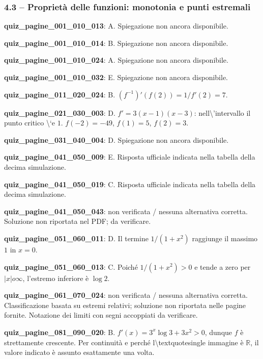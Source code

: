 \documentclass[11pt,a4paper]{article}
\newcounter{quiz}
\begin{document}
\subsubsection*{4.3 -- Proprietà delle funzioni: monotonia e punti estremali}
\noindent\textbf{quiz\_pagine\_001\_010\_013}: A. Spiegazione non ancora disponibile.\par\medskip
\noindent\textbf{quiz\_pagine\_001\_010\_014}: B. Spiegazione non ancora disponibile.\par\medskip
\noindent\textbf{quiz\_pagine\_001\_010\_024}: A. Spiegazione non ancora disponibile.\par\medskip
\noindent\textbf{quiz\_pagine\_001\_010\_032}: E. Spiegazione non ancora disponibile.\par\medskip
\noindent\textbf{quiz\_pagine\_011\_020\_024}: B. $(f^{-1})\prime(f(2))=1/f\prime(2)=7$.\par\medskip
\noindent\textbf{quiz\_pagine\_021\_030\_003}: D. $f\prime=3(x-1)(x-3)$: nell\textbackslash{}'intervallo il punto critico \textbackslash{}`e $1$. $f(-2)=-49$, $f(1)=5$, $f(2)=3$.\par\medskip
\noindent\textbf{quiz\_pagine\_031\_040\_004}: D. Spiegazione non ancora disponibile.\par\medskip
\noindent\textbf{quiz\_pagine\_041\_050\_009}: E. Risposta ufficiale indicata nella tabella della decima simulazione.\par\medskip
\noindent\textbf{quiz\_pagine\_041\_050\_019}: C. Risposta ufficiale indicata nella tabella della decima simulazione.\par\medskip
\noindent\textbf{quiz\_pagine\_041\_050\_043}: non verificata / nessuna alternativa corretta. Soluzione non riportata nel PDF; da verificare.\par\medskip
\noindent\textbf{quiz\_pagine\_051\_060\_011}: D. Il termine $1/(1+x^2)$ raggiunge il massimo $1$ in $x=0$.\par\medskip
\noindent\textbf{quiz\_pagine\_051\_060\_013}: C. Poiché $1/(1+x^2)>0$ e tende a zero per $|x|	o\infty$, l'estremo inferiore è $\log2$.\par\medskip
\noindent\textbf{quiz\_pagine\_061\_070\_024}: non verificata / nessuna alternativa corretta. Classificazione basata su estremi relativi; soluzione non riportata nelle pagine fornite. Notazione dei limiti con segni accoppiati da verificare.\par\medskip
\noindent\textbf{quiz\_pagine\_081\_090\_020}: B. $f\prime(x)=3^x\log3+3x^2>0$, dunque $f$ è strettamente crescente. Per continuità e perché l\textbackslash{}textquotesingle immagine è $\mathbb R$, il valore indicato è assunto esattamente una volta.\par\medskip
\end{document}
